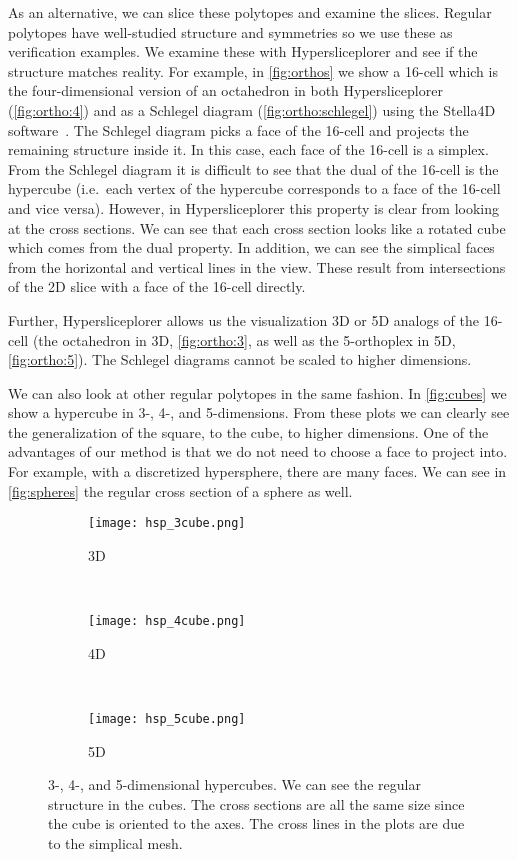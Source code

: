 As an alternative, we can slice these polytopes and examine the slices.
Regular polytopes have well-studied structure and symmetries so we use these as
verification examples. We examine these with Hypersliceplorer and see if the
structure matches reality.  For example, in \autoref{fig:orthos} we show a
16-cell which is the four-dimensional version of an octahedron in both
Hypersliceplorer (\autoref{fig:ortho:4}) and as a Schlegel diagram (\autoref{fig:ortho:schlegel})
using the Stella4D software~\cite{Stella4D}. The
Schlegel diagram picks a face of the 16-cell and projects the remaining
structure inside it. In this case, each face of the 16-cell is a simplex. From
the Schlegel diagram it is difficult to see that the dual of the 16-cell is the
hypercube (i.e.\ each vertex of the hypercube corresponds to a face of the 16-cell and vice
versa). However, in Hypersliceplorer this property is clear from looking at the
cross sections. We can see that each cross section looks like a rotated cube
which comes from the dual property. In addition, we can see the simplical faces
from the horizontal and vertical lines in the view.  These result from intersections of the
2D slice with a face of the 16-cell directly.

Further, Hypersliceplorer allows us the visualization 3D or 5D analogs of the 16-cell (the octahedron in 3D, \autoref{fig:ortho:3}, as well as the 5-orthoplex in 5D, \autoref{fig:ortho:5}). The Schlegel diagrams cannot be scaled to higher dimensions.

We can also look at other regular polytopes in the same fashion. In
\autoref{fig:cubes} we show a hypercube in 3-, 4-, and 5-dimensions. From these
plots we can clearly see the generalization of the square, to the cube, to
higher dimensions. One of the advantages of our method is that we do not need
to choose a face to project into. For example, with a discretized hypersphere,
there are many faces. We can see in \autoref{fig:spheres} the regular cross
section of a sphere as well. 

\begin{figure} 
  \centering
  \begin{subfigure}[b]{0.3\linewidth}
    \texttt{[image: hsp\_3cube.png]}
    \caption{3D}
    \label{fig:cubes:3d} 
  \end{subfigure} 
  ~
  \begin{subfigure}[b]{0.3\linewidth}
    \texttt{[image: hsp\_4cube.png]}
    \caption{4D}
    \label{fig:cubes:4d} 
  \end{subfigure}
  ~
  \begin{subfigure}[b]{0.3\linewidth}
    \texttt{[image: hsp\_5cube.png]}
    \caption{5D}
    \label{fig:cubes:5d} 
  \end{subfigure}
  \caption{%
    3-, 4-, and 5-dimensional hypercubes. We can see the regular structure
    in the cubes. The cross sections are all the same size since the cube
    is oriented to the axes. The cross lines in the plots are due to the 
    simplical mesh.
  } 
  \label{fig:cubes} 
\end{figure}

